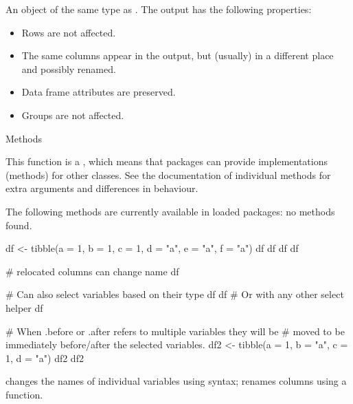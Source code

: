 \documentclass[a4paper]{book}
\begin{document}
%
\begin{Value}
An object of the same type as . The output has the following
properties:
\begin{itemize}

\item{} Rows are not affected.
\item{} The same columns appear in the output, but (usually) in a different place
and possibly renamed.
\item{} Data frame attributes are preserved.
\item{} Groups are not affected.

\end{itemize}

\end{Value}
%
\begin{Section}{Methods}

This function is a , which means that packages can provide
implementations (methods) for other classes. See the documentation of
individual methods for extra arguments and differences in behaviour.

The following methods are currently available in loaded packages:
no methods found.
\end{Section}
%
\begin{Examples}
\begin{ExampleCode}
df <- tibble(a = 1, b = 1, c = 1, d = "a", e = "a", f = "a")
df %
df %
df %
df %

# relocated columns can change name
df %

# Can also select variables based on their type
df %
df %
# Or with any other select helper
df %

# When .before or .after refers to multiple variables they will be
# moved to be immediately before/after the selected variables.
df2 <- tibble(a = 1, b = "a", c = 1, d = "a")
df2 %
df2 %
\end{ExampleCode}
\end{Examples}
%
\begin{Description}
 changes the names of individual variables using
 syntax;  renames columns using a
function.
\end{Description}
\end{document}
